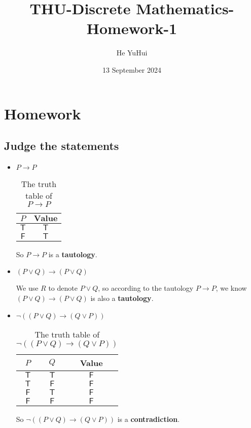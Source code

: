\documentclass{article}
\title{THU-Discrete Mathematics-Homework-1}
\author{He YuHui\quad 2022012050}
\date{13 September 2024}
\begin{document}
\maketitle

\section{Homework}

\subsection{Judge the statements}

\begin{itemize}
    \item $P\to P$
    
    \begin{table}[h!]
        \centering
        \begin{tabular}{c|c}
             $P$ & $\textbf{Value}$ \\ 
             \hline
             $\mathsf{T}$ & $\mathsf{T}$\\
             $\mathsf{F}$ & $\mathsf{T}$
        \end{tabular}
        \caption{The truth table of $P\to P$}
        \label{tab:The Truth Tabel-1}
    \end{table}
    
    So $P\to P$ is a \textbf{tautology}.

    \item $(P\vee Q)\to(P\vee Q)$

    We use $R$ to denote $P\vee Q$, so according to the tautology $P\to P$, we know $(P\vee Q)\to(P\vee Q)$ is also a \textbf{tautology}.

    \item $\lnot((P\vee Q)\to(Q\vee P))$

    \begin{table}[h!]
        \centering
        \begin{tabular}{c|c|c}
             $P$ & $Q$ & \textbf{Value} \\
             \hline
             $\mathsf{T}$ & $\mathsf{T}$ & $\mathsf{F}$\\
             $\mathsf{T}$ & $\mathsf{F}$ & $\mathsf{F}$\\
             $\mathsf{F}$ & $\mathsf{T}$ & $\mathsf{F}$\\
             $\mathsf{F}$ & $\mathsf{F}$ & $\mathsf{F}$
        \end{tabular}
        \caption{The truth table of $\lnot((P\vee Q)\to(Q\vee P))$}
        \label{tab:The Truth Tabel-2}
    \end{table}

    So $\lnot((P\vee Q)\to(Q\vee P))$ is a \textbf{contradiction}.
 
\end{itemize}
\end{document}
